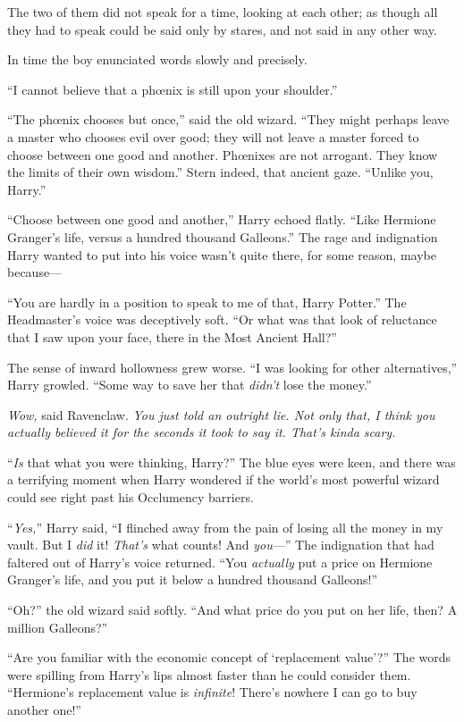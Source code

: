 The two of them did not speak for a time, looking at each other; as though all they had to speak could be said only by stares, and not said in any other way.

In time the boy enunciated words slowly and precisely.

“I cannot believe that a phœnix is still upon your shoulder.”

“The phœnix chooses but once,” said the old wizard.
“They might perhaps leave a master who chooses evil over good; they will not leave a master forced to choose between one good and another. Phœnixes are not arrogant. They know the limits of their own wisdom.” Stern indeed, that ancient gaze.
“Unlike you, Harry.”

“Choose between one good and another,” Harry echoed flatly.
“Like Hermione Granger’s life, versus a hundred thousand Galleons.” The rage and indignation Harry wanted to put into his voice wasn’t quite there, for some reason, maybe because—

“You are hardly in a position to speak to me of that, Harry Potter.” The Headmaster’s voice was deceptively soft.
“Or what was that look of reluctance that I saw upon your face, there in the Most Ancient Hall?”

The sense of inward hollowness grew worse.
“I was looking for other alternatives,” Harry growled.
“Some way to save her that \emph{didn’t} lose the money.”

\emph{Wow,} said Ravenclaw. \emph{You just told an outright lie. Not only that, I think you actually \emph{believed} it for the seconds it took to say it. That’s kinda scary.}

“\emph{Is} that what you were thinking, Harry?” The blue eyes were keen, and there was a terrifying moment when Harry wondered if the world’s most powerful wizard could see right past his Occlumency barriers.

“\emph{Yes,}” Harry said,
“I flinched away from the pain of losing all the money in my vault. But I \emph{did} it! \emph{That’s} what counts! And \emph{you}—” The indignation that had faltered out of Harry’s voice returned.
“You \emph{actually} put a price on Hermione Granger’s life, and you put it below a hundred thousand Galleons!”

“Oh?” the old wizard said softly.
“And what price do you put on her life, then? A million Galleons?”

“Are you familiar with the economic concept of ‘replacement value’?” The words were spilling from Harry’s lips almost faster than he could consider them.
“Hermione’s replacement value is \emph{infinite}! There’s nowhere I can go to buy another one!”

